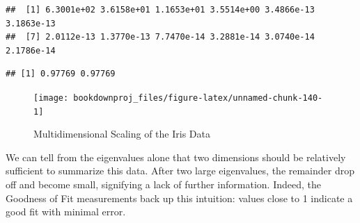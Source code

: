 \documentclass[
]{article}
\newenvironment{Shaded}{\begin{snugshade}}{\end{snugshade}}
\newcommand{\AttributeTok}[1]{\textcolor[rgb]{0.77,0.63,0.00}{#1}}
\newcommand{\CommentTok}[1]{\textcolor[rgb]{0.56,0.35,0.01}{\textit{#1}}}
\newcommand{\DecValTok}[1]{\textcolor[rgb]{0.00,0.00,0.81}{#1}}
\newcommand{\FunctionTok}[1]{\textcolor[rgb]{0.00,0.00,0.00}{#1}}
\newcommand{\NormalTok}[1]{#1}
\newcommand{\OtherTok}[1]{\textcolor[rgb]{0.56,0.35,0.01}{#1}}
\newcommand{\SpecialCharTok}[1]{\textcolor[rgb]{0.00,0.00,0.00}{#1}}
\newcommand{\StringTok}[1]{\textcolor[rgb]{0.31,0.60,0.02}{#1}}
\theoremstyle{definition}
\theoremstyle{definition}
\theoremstyle{definition}
\theoremstyle{definition}
\theoremstyle{remark}
\begin{document}
\begin{verbatim}
##  [1] 6.3001e+02 3.6158e+01 1.1653e+01 3.5514e+00 3.4866e-13 3.1863e-13
##  [7] 2.0112e-13 1.3770e-13 7.7470e-14 3.2881e-14 3.0740e-14 2.1786e-14
\end{verbatim}

\begin{Shaded}
\end{Shaded}

\begin{verbatim}
## [1] 0.97769 0.97769
\end{verbatim}

\begin{Shaded}
\end{Shaded}

\begin{figure}

{\centering \texttt{[image: bookdownproj\_files/figure-latex/unnamed-chunk-140-1]} 

}

\caption{Multidimensional Scaling of the Iris Data}\label{fig:unnamed-chunk-140}
\end{figure}

We can tell from the eigenvalues alone that two dimensions should be relatively sufficient to summarize this data. After two large eigenvalues, the remainder drop off and become small, signifying a lack of further information. Indeed, the Goodness of Fit measurements back up this intuition: values close to 1 indicate a good fit with minimal error.
\end{document}
